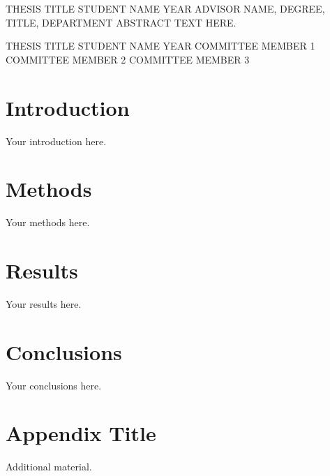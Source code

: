 \documentclass[12pt,oneside]{report}
\begin{document}
\apcsabstract
{THESIS TITLE}
{STUDENT NAME}
{YEAR}
{ADVISOR NAME, DEGREE, TITLE, DEPARTMENT}
{ABSTRACT TEXT HERE.}

\thesistitlepage
{THESIS TITLE}
{STUDENT NAME}
{YEAR}
{COMMITTEE MEMBER 1}
{COMMITTEE MEMBER 2}
{COMMITTEE MEMBER 3}

\frontmatter
\dedication{DEDICATION TEXT HERE.}

\tableofcontents
\listoftables
\listoffigures

\mainmatter
\chapter{Introduction}
Your introduction here.

\chapter{Methods}
Your methods here.

\chapter{Results}
Your results here.

\chapter{Conclusions}
Your conclusions here.

\printbibliography[title={LITERATURE CITED}]
\blankpage

\appendix
\chapter{Appendix Title}
Additional material.
\end{document}
